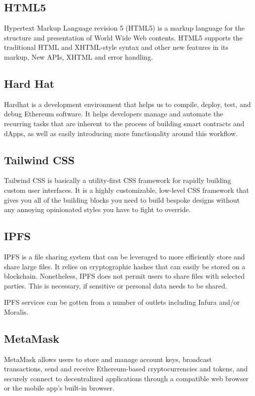 \documentclass[a4paper,12pt]{article}
\begin{document}
\subsection{HTML5}

Hypertext Markup Language revision 5 (HTML5) is a markup language for the structure and presentation of World Wide Web contents. HTML5 supports the traditional HTML and XHTML-style syntax and other new features in its markup, New APIs, XHTML and error handling.

\subsection{Hard Hat}

Hardhat is a development environment that helps us to compile, deploy, test, and debug  Ethereum software. It helps developers manage and automate the recurring tasks that are inherent to the process of building smart contracts and dApps, as well as easily introducing more functionality around this workflow.



\subsection{Tailwind CSS}
Tailwind CSS is basically a utility-first CSS framework for rapidly building custom user interfaces. It is a highly customizable, low-level CSS framework that gives you all of the building blocks you need to build bespoke designs without any annoying opinionated styles you have to fight to override.

\subsection{IPFS}
IPFS is a file sharing system that can be leveraged to more efficiently store and share large files. It relies on cryptographic hashes that can easily be stored on a blockchain. Nonetheless, IPFS does not permit users to share files with selected parties. This is necessary, if sensitive or personal data needs to be shared.

IPFS services can be gotten from a number of outlets including Infura and/or Moralis.

\subsection{MetaMask}


MetaMask allows users to store and manage account keys, broadcast transactions, send and receive Ethereum-based cryptocurrencies and tokens, and securely connect to decentralized applications through a compatible web browser or the mobile app's built-in browser.
\end{document}
